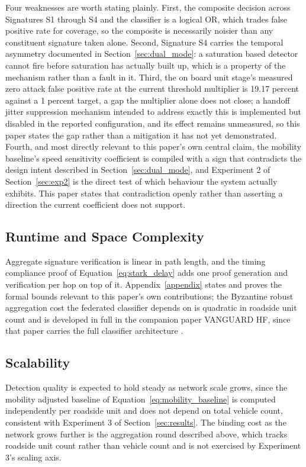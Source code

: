 \documentclass[final,5p,twocolumn]{elsarticle}
\theoremstyle{remark}
\theoremstyle{plain}
\begin{document}
Four weaknesses are worth stating plainly. First, the composite decision
across Signatures S1 through S4 and the classifier is a logical OR, which
trades false positive rate for coverage, so the composite is necessarily
noisier than any constituent signature taken alone. Second, Signature S4
carries the temporal asymmetry documented in Section~\ref{sec:dual_mode}: a
saturation based detector cannot fire before saturation has actually built
up, which is a property of the mechanism rather than a fault in it. Third,
the on board unit stage's measured zero attack false positive rate at the
current threshold multiplier is 19.17 percent against a 1 percent target,
a gap the multiplier alone does not close; a handoff jitter suppression
mechanism intended to address exactly this is implemented but disabled in
the reported configuration, and its effect remains unmeasured, so this
paper states the gap rather than a mitigation it has not yet demonstrated.
Fourth, and most directly relevant to this paper's own central claim, the
mobility baseline's speed sensitivity coefficient is compiled with a sign
that contradicts the design intent described in
Section~\ref{sec:dual_mode}, and Experiment 2 of
Section~\ref{sec:exp2} is the direct test of which behaviour the system
actually exhibits. This paper states that contradiction openly rather than
asserting a direction the current coefficient does not support.

\subsection{Runtime and Space Complexity}
\label{sec:complexity}
Aggregate signature verification is linear in path length, and the timing
compliance proof of Equation~\eqref{eq:stark_delay} adds one proof
generation and verification per hop on top of it. Appendix~\ref{appendix}
states and proves the formal bounds relevant to this paper's own
contributions; the Byzantine robust aggregation cost the federated
classifier depends on is quadratic in roadside unit count and is developed
in full in the companion paper VANGUARD HF, since that paper carries the
full classifier architecture \cite{VanguardHF2026}.

\subsection{Scalability}
Detection quality is expected to hold steady as network scale grows, since
the mobility adjusted baseline of Equation~\eqref{eq:mobility_baseline} is
computed independently per roadside unit and does not depend on total
vehicle count, consistent with Experiment 3 of Section~\ref{sec:results}.
The binding cost as the network grows further is the aggregation round
described above, which tracks roadside unit count rather than vehicle
count and is not exercised by Experiment 3's scaling axis.
\end{document}
